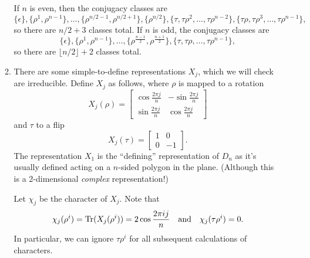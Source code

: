 \documentclass{amsart}
\DeclareMathOperator{\Tr}{Tr}
\begin{document}
\begin{enumerate}
\begin{enumerate}
        If $n$ is even, then the conjugacy classes are
        \[
        \{\epsilon\}, \{\rho^1, \rho^{n-1}\}, \dots, \{\rho^{n/2-1}, \rho^{n/2+1}\}, \{\rho^{n/2}\}, \{\tau, \tau\rho^2, \dots, \tau\rho^{n-2}\}, \{\tau\rho, \tau\rho^3, \dots, \tau\rho^{n-1}\},
        \]
        so there are $n/2 + 3$ classes total. If $n$ is odd, the conjugacy classes are
        \[
        \{\epsilon\}, \{\rho^1, \rho^{n-1}\}, \dots, \{\rho^{\frac{n-1}{2}}, \rho^{\frac{n+1}{2}}\},  \{\tau, \tau\rho, \dots, \tau\rho^{n-1}\},
        \]
        so there are $\lfloor n/2 \rfloor + 2$ classes total.
        \item There are some simple-to-define representations $X_j$, which we will
        check are irreducible.  Define $X_j$ as follows, where $\rho$ is mapped
        to a rotation
        \[
        X_j(\rho) = \begin{bmatrix} \cos \frac{2\pi j}{n} & -\sin \frac{2\pi j}{n} \\
                                    \sin \frac{2\pi j}{n} & \cos \frac{2\pi j}{n}
                    \end{bmatrix}
        \]
        and $\tau$ to a flip
        \[
        X_j(\tau) = \begin{bmatrix} 1 & 0 \\ 0 & -1 \end{bmatrix}.
        \]
        The representation $X_1$ is the ``defining'' representation of $D_n$ as it's
        usually defined acting on a $n$-sided polygon in the plane. (Although this is a 2-dimensional \emph{complex} representation!)

        Let $\chi_j$ be the character of $X_j$.  Note that 
        \[
        \chi_j(\rho^i) = \Tr(X_j(\rho^i)) = 2\cos \frac{2\pi i j}{n} \quad \textnormal{and} \quad \chi_j(\tau\rho^i) = 0.
       \]
       In particular, we can ignore $\tau\rho^i$ for all subsequent calculations of characters.


\end{enumerate}
\end{enumerate}
\end{document}
